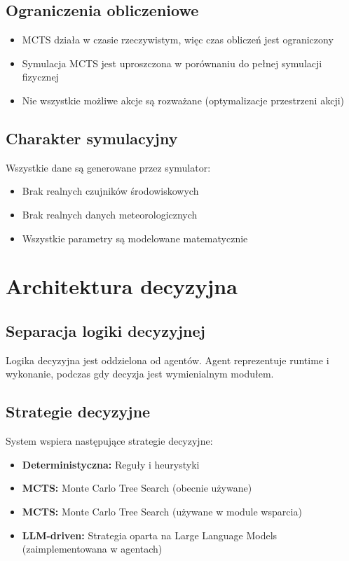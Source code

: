 \documentclass[11pt,a4paper]{article}
\begin{document}
\subsection{Ograniczenia obliczeniowe}

\begin{itemize}
    \item MCTS działa w czasie rzeczywistym, więc czas obliczeń jest ograniczony
    \item Symulacja MCTS jest uproszczona w porównaniu do pełnej symulacji fizycznej
    \item Nie wszystkie możliwe akcje są rozważane (optymalizacje przestrzeni akcji)
\end{itemize}

\subsection{Charakter symulacyjny}

Wszystkie dane są generowane przez symulator:
\begin{itemize}
    \item Brak realnych czujników środowiskowych
    \item Brak realnych danych meteorologicznych
    \item Wszystkie parametry są modelowane matematycznie
\end{itemize}

\section{Architektura decyzyjna}

\subsection{Separacja logiki decyzyjnej}

Logika decyzyjna jest oddzielona od agentów. Agent reprezentuje runtime i wykonanie, podczas gdy decyzja jest wymienialnym modułem.

\subsection{Strategie decyzyjne}

System wspiera następujące strategie decyzyjne:

\begin{itemize}
    \item \textbf{Deterministyczna:} Reguły i heurystyki
    \item \textbf{MCTS:} Monte Carlo Tree Search (obecnie używane)
    \item \textbf{MCTS:} Monte Carlo Tree Search (używane w module wsparcia)
    \item \textbf{LLM-driven:} Strategia oparta na Large Language Models (zaimplementowana w agentach)
\end{itemize}
\end{document}
